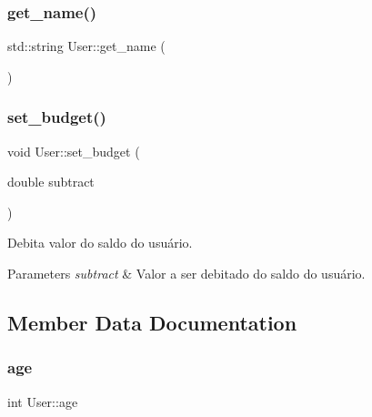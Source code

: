 \subsubsection{\texorpdfstring{get\+\_\+name()}{get\_name()}}
{\footnotesize\ttfamily std\+::string User\+::get\+\_\+name (\begin{DoxyParamCaption}{ }\end{DoxyParamCaption})\hspace{0.3cm}{\ttfamily [inline]}}

\mbox{\label{class_user_afd53679c08d593a54e8e03ec62aab9fd}} 
\subsubsection{\texorpdfstring{set\+\_\+budget()}{set\_budget()}}
{\footnotesize\ttfamily void User\+::set\+\_\+budget (\begin{DoxyParamCaption}\item[{double}]{subtract }\end{DoxyParamCaption})}



Debita valor do saldo do usuário. 


\begin{DoxyParams}{Parameters}
{\em subtract} & Valor a ser debitado do saldo do usuário. \\
\hline
\end{DoxyParams}


\subsection{Member Data Documentation}
\mbox{\label{class_user_aa5829689588d1f982e1a69b73bd68655}} 
\subsubsection{\texorpdfstring{age}{age}}
{\footnotesize\ttfamily int User\+::age\hspace{0.3cm}{\ttfamily [protected]}}

\mbox{\label{class_user_a9c4a23a62f53b4c1c289c27785a5868f}} 
